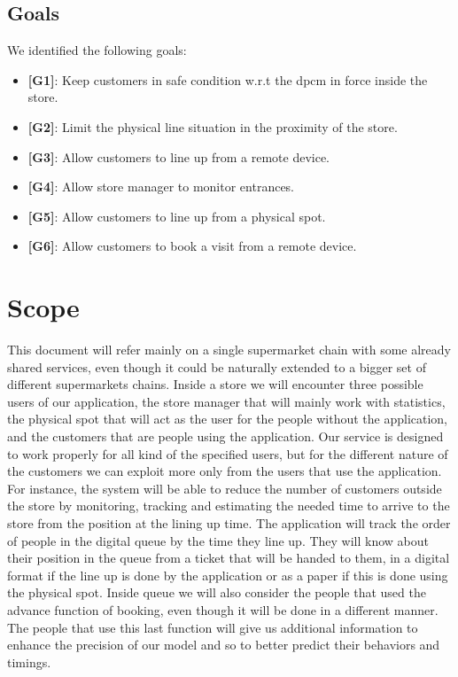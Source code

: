 \subsection{Goals}

We identified the following goals:

\begin{itemize}

	\item {\textbf{[G1]}}: Keep customers in safe condition w.r.t the \gls{dpcm} in force inside the store.
		
	\item {\textbf{[G2]}}: Limit the physical line situation in the proximity of the store.
		
	\item {\textbf{[G3]}}: Allow customers to line up from a remote device.
	
	\item {\textbf{[G4]}}: Allow store manager to monitor entrances.
	
	\item {\textbf{[G5]}}: Allow customers to line up from a physical spot.
	
	\item {\textbf{[G6]}}: Allow customers to book a visit from a remote
device.

\end{itemize}

\section{Scope}

This document will refer mainly on a single supermarket chain with some already shared services, even though it could be naturally extended to a bigger set of different supermarkets chains. Inside a store we will encounter three possible users of our application, the store manager that will mainly work with statistics, the physical spot that will act as the user for the people without the application, and the customers that are people using the application.
Our service is designed to work properly for all kind of the specified users, but for the different nature of the customers we can exploit more only from the users that use the application.
For instance, the system will be able to reduce the number of customers outside the store by monitoring, tracking and estimating the needed time to arrive to the store from the position at the lining up time.
The application will track the order of people in the digital queue by the time they line up. They will know about their position in the queue from a ticket that will be handed to them, in a digital format if the line up is done by the application or as a paper if this is done using the physical spot. Inside queue we will also consider the people that used the advance function of booking, even though it will be done in a different manner. The people that use this last function will give us additional information to enhance the precision of our model and so to better predict their behaviors and timings. 

